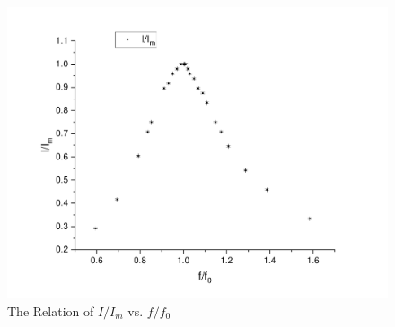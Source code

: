 \documentclass{my_template}
\begin{document}
    \begin{figure}[H]
        \centering
        \includegraphics[width=\textwidth]{fig/Iandf.pdf}
        \caption{The Relation of $I/I_m$ vs. $f/f_0$}
        \label{fig:Iandf}
    \end{figure}
\end{document}
